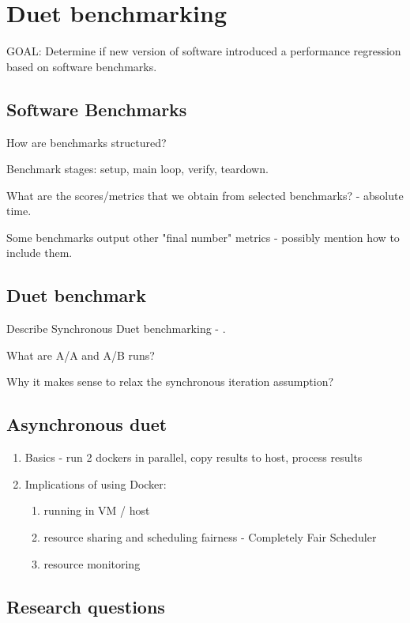 \chapter{Duet benchmarking}
\label{chap:duet}

GOAL: Determine if new version of software introduced a performance regression based on software benchmarks.


\section{Software Benchmarks}

How are benchmarks structured?

Benchmark stages: setup, main loop, verify, teardown.

What are the scores/metrics that we obtain from selected benchmarks? - absolute time.

Some benchmarks output other "final number" metrics - possibly mention how to include them.


\section{Duet benchmark}

Describe Synchronous Duet benchmarking - \citet{bulej2020duet}.

What are A/A and A/B runs?


Why it makes sense to relax the synchronous iteration assumption?


\section{Asynchronous duet}

\begin{enumerate}
	\item Basics - run 2 dockers in parallel, copy results to host, process results
	\item Implications of using Docker:
	      \begin{enumerate}
		      \item running in VM / host
		      \item resource sharing and scheduling fairness - Completely Fair Scheduler
		      \item resource monitoring
	      \end{enumerate}
\end{enumerate}


\section{Research questions}

